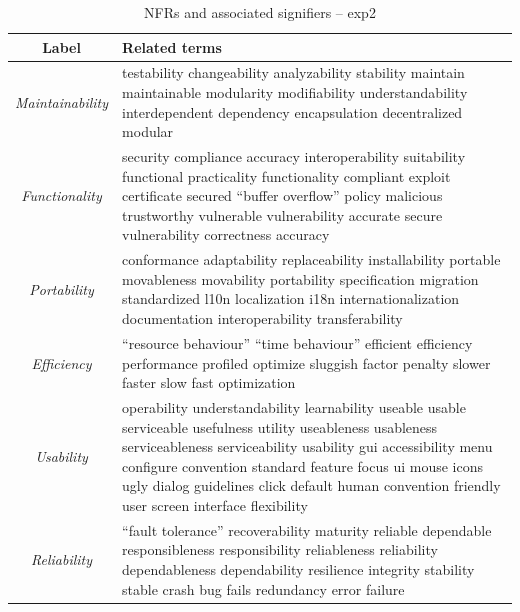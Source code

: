 \documentclass[]{sig-alternate}
\begin{document}
\begin{table}[]
	\centering
\begin{tabular}{c|p{11cm}}
\toprule
\textbf{Label} & \textbf{Related terms} \\
\midrule
\emph{Maintainability} &
testability changeability analyzability stability maintain maintainable modularity modifiability understandability interdependent dependency encapsulation decentralized modular\\ \hline
\emph{Functionality} &
security compliance accuracy interoperability suitability functional practicality functionality compliant exploit certificate secured ``buffer overflow'' policy malicious trustworthy vulnerable vulnerability accurate secure vulnerability correctness accuracy\\ \hline
\emph{Portability} &
conformance adaptability replaceability installability portable movableness movability portability specification migration standardized l10n localization i18n internationalization documentation interoperability transferability\\ \hline
\emph{Efficiency} &
``resource behaviour'' ``time behaviour'' efficient efficiency performance profiled optimize sluggish factor penalty slower faster slow fast optimization\\ \hline
\emph{Usability} &
operability understandability learnability useable usable serviceable usefulness utility useableness usableness serviceableness serviceability usability gui accessibility menu configure convention standard feature focus ui mouse icons ugly dialog guidelines click default human convention friendly user screen interface flexibility\\ \hline
\emph{Reliability} &
``fault tolerance'' recoverability maturity reliable dependable responsibleness responsibility reliableness reliability dependableness dependability resilience integrity stability stable crash bug fails redundancy error failure\\ 
\bottomrule
\end{tabular}
	\caption{NFRs and associated signifiers -- \textsf{exp2}}
	\label{tbl:wnsig}

\end{table}
\end{document}
